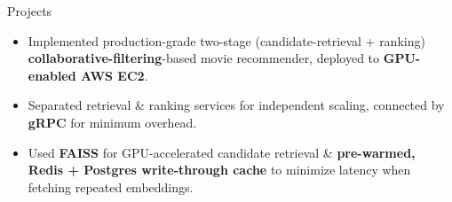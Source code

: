 \documentclass{resume} %
\begin{document}
\begin{workSection}{Projects}
	\customItem[
		title=\href{https://github.com/AshkanArabim/movie-recommender}{Movie Rec Engine \faExternalLink},
		technologies= | FAISS{,} Redis{,} gRPC{,} PyTorch{,} FastAPI{,} Postgres{,} AWS,
	]
	\begin{itemize}
		\vspace{-0.5em}
		\itemsep -6pt {}
		\item Implemented production-grade two-stage (candidate-retrieval + ranking) \textbf{collaborative-filtering}-based movie recommender, deployed to \textbf{GPU-enabled AWS EC2}.
		\item Separated retrieval \& ranking services for independent scaling, connected by \textbf{gRPC} for minimum overhead.
		\item Used \textbf{FAISS} for GPU-accelerated candidate retrieval \& \textbf{pre-warmed, Redis + Postgres write-through cache} to minimize latency when fetching repeated embeddings.
	\end{itemize}


\end{workSection}
\end{document}
